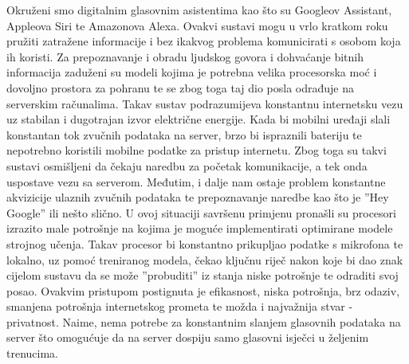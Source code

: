 Okruženi smo digitalnim glasovnim asistentima kao što su Googleov Assistant,
Appleova Siri te Amazonova Alexa. Ovakvi sustavi mogu u vrlo kratkom
roku pružiti zatražene informacije i bez ikakvog problema komunicirati s osobom
koja ih koristi. Za prepoznavanje i obradu ljudskog govora i dohvaćanje bitnih
informacija zaduženi su modeli kojima je potrebna velika procesorska moć i dovoljno
prostora za pohranu te se zbog toga taj dio posla odrađuje na serverskim računalima.
Takav sustav podrazumijeva konstantnu internetsku vezu uz stabilan i dugotrajan
izvor električne energije. Kada bi mobilni uređaji slali konstantan tok zvučnih podataka
na server, brzo bi ispraznili bateriju te nepotrebno koristili mobilne podatke za
pristup internetu. Zbog toga su takvi sustavi osmišljeni da čekaju naredbu za
početak komunikacije, a tek onda uspostave vezu sa serverom. Međutim, i dalje
nam ostaje problem konstantne akvizicije ulaznih zvučnih podataka te prepoznavanje
naredbe kao što je ”Hey Google” ili nešto slično. U ovoj situaciji savršenu primjenu
pronašli su procesori izrazito male potrošnje na kojima je moguće implementirati
optimirane modele strojnog učenja. Takav procesor bi konstantno prikupljao podatke
s mikrofona te lokalno, uz pomoć treniranog modela, čekao ključnu riječ nakon
koje bi dao znak cijelom sustavu da se može ”probuditi” iz stanja niske
potrošnje te odraditi svoj posao. Ovakvim pristupom postignuta je efikasnost, niska
potrošnja, brz odaziv, smanjena potrošnja internetskog prometa te možda i
najvažnija stvar - privatnost. Naime, nema potrebe za konstantnim slanjem glasovnih
podataka na server što omogućuje da na server dospiju samo glasovni isječci u
željenim trenucima.
